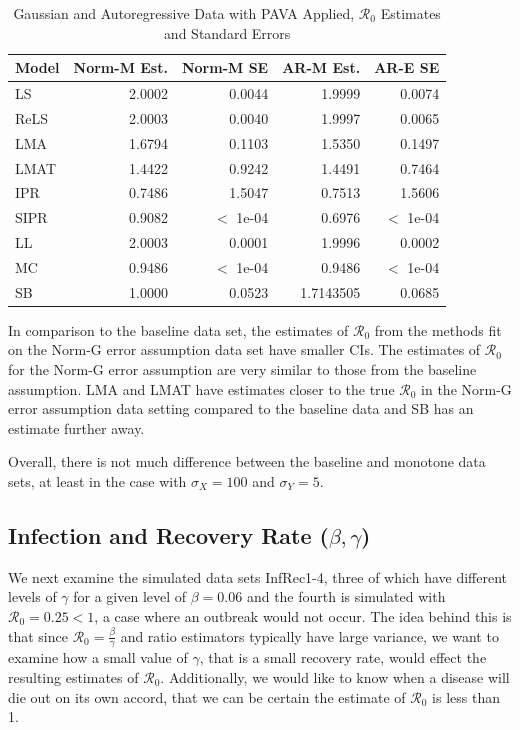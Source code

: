 \documentclass[12pt]{article}
\newcommand{\rr}{\ensuremath{\mathcal{R}_0}}
\begin{document}
\begin{table}[H]
	
	\centering
	\begin{tabular}[t]{l|r|r|r|r}
		\hline
		Model & Norm-M Est. & Norm-M SE & AR-M Est. & AR-E SE\\
		\hline
		LS & 2.0002 & 0.0044 & 1.9999 & 0.0074\\
		\hline
		ReLS & 2.0003 & 0.0040 & 1.9997 & 0.0065\\
		\hline
		LMA & 1.6794 & 0.1103 & 1.5350 & 0.1497\\
		\hline
		LMAT & 1.4422 & 0.9242 & 1.4491 & 0.7464\\
		\hline
		IPR & 0.7486 & 1.5047 & 0.7513 & 1.5606\\
		\hline
		SIPR & 0.9082 & $<$ 1e-04 & 0.6976 & $<$ 1e-04\\
		\hline
		LL & 2.0003 & 0.0001 & 1.9996 & 0.0002\\
		\hline
		MC & 0.9486 & $<$ 1e-04 & 0.9486 & $<$ 1e-04\\
		\hline
		SB & 1.0000 & 0.0523 & 1.7143505 & 0.0685\\
		\hline
	\end{tabular}
\caption{Gaussian and Autoregressive Data with PAVA Applied, $\rr$ Estimates and Standard Errors}\label{tab:pava-res}
\end{table}

In comparison to the baseline data set, the estimates of $\rr$ from the methods fit on the Norm-G error assumption data set have smaller CIs.  The estimates of $\rr$ for the Norm-G error assumption are very similar to those from the baseline assumption.  LMA and LMAT have estimates closer to the true $\rr$ in the Norm-G error assumption data setting compared to the baseline data and SB has an estimate further away.

Overall, there is not much difference between the baseline and monotone data sets, at least in the case with $\sigma_X=100$ and $\sigma_Y=5$.  

\subsection{Infection and Recovery Rate ($\beta, \gamma$)}\label{sec:res-beta-gamma}

We next examine the simulated data sets InfRec1-4, three of which have different levels of $\gamma$ for a given level of $\beta = 0.06$ and the fourth is simulated with $\rr=0.25 < 1$, a case where an outbreak would not occur.  The idea behind this is that since $\rr=\frac{\beta}{\gamma}$ and ratio estimators typically have large variance, we want to examine how a small value of $\gamma$, that is a small recovery rate, would effect the resulting estimates of $\rr$.  Additionally, we would like to know when a disease will die out on its own accord, that we can be certain the estimate of $\rr$ is less than 1.
\end{document}

